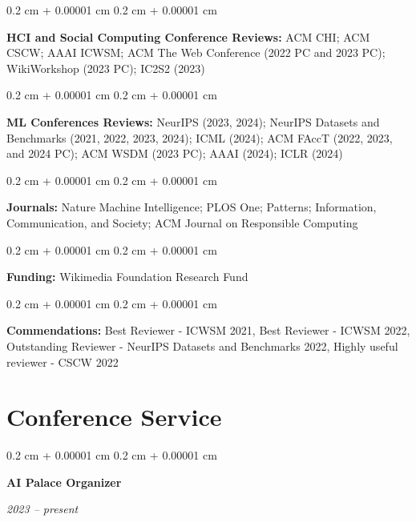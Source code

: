 \documentclass[10pt, letterpaper]{article}
\newenvironment{onecolentry}{
    \begin{adjustwidth}{
        0.2 cm + 0.00001 cm
    }{
        0.2 cm + 0.00001 cm
    }
}{
    \end{adjustwidth}
} %
\newenvironment{twocolentry}[2][]{
    \onecolentry
    \def\secondColumn{#2}
    \setcolumnwidth{\fill, 4.1 cm}
    \begin{paracol}{2}
}{
    \switchcolumn \raggedleft \secondColumn
    \end{paracol}
    \endonecolentry
} %
\begin{document}
        \vspace{0.2 cm}

        \begin{onecolentry}
            \textbf{HCI and Social Computing Conference Reviews:} ACM CHI; ACM CSCW; AAAI ICWSM; ACM The Web Conference (2022 PC and 2023 PC); WikiWorkshop (2023 PC); IC2S2 (2023)
        \end{onecolentry}

        \vspace{0.2 cm}

        \begin{onecolentry}
            \textbf{ML Conferences Reviews:} NeurIPS (2023, 2024); NeurIPS Datasets and Benchmarks (2021, 2022, 2023, 2024); ICML (2024); ACM FAccT (2022, 2023, and 2024 PC); ACM WSDM (2023 PC); AAAI (2024); ICLR (2024)
        \end{onecolentry}

        \vspace{0.2 cm}

        \begin{onecolentry}
            \textbf{Journals:} Nature Machine Intelligence; PLOS One; Patterns; Information, Communication, and Society; ACM Journal on Responsible Computing
        \end{onecolentry}

        \vspace{0.2 cm}

        \begin{onecolentry}
            \textbf{Funding:} Wikimedia Foundation Research Fund
        \end{onecolentry}

        \vspace{0.2 cm}

        \begin{onecolentry}
            \textbf{Commendations:} Best Reviewer - ICWSM 2021, Best Reviewer - ICWSM 2022, Outstanding Reviewer - NeurIPS Datasets and Benchmarks 2022, Highly useful reviewer - CSCW 2022
        \end{onecolentry}


    
    \section{Conference Service}



        
        \begin{twocolentry}{
            
            
        \textit{2023 -- present}}
            \textbf{AI Palace Organizer}
        \end{twocolentry}
\end{document}
